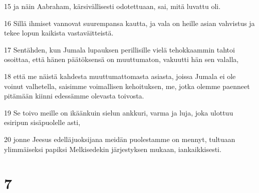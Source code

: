 \par 15 ja näin Aabraham, kärsivällisesti odotettuaan, sai, mitä luvattu oli.
\par 16 Sillä ihmiset vannovat suurempansa kautta, ja vala on heille asian vahvistus ja tekee lopun kaikista vastaväitteistä.
\par 17 Sentähden, kun Jumala lupauksen perillisille vielä tehokkaammin tahtoi osoittaa, että hänen päätöksensä on muuttumaton, vakuutti hän sen valalla,
\par 18 että me näistä kahdesta muuttumattomasta asiasta, joissa Jumala ei ole voinut valhetella, saisimme voimallisen kehoituksen, me, jotka olemme paenneet pitämään kiinni edessämme olevasta toivosta.
\par 19 Se toivo meille on ikäänkuin sielun ankkuri, varma ja luja, joka ulottuu esiripun sisäpuolelle asti,
\par 20 jonne Jeesus edelläjuoksijana meidän puolestamme on mennyt, tultuaan ylimmäiseksi papiksi Melkisedekin järjestyksen mukaan, iankaikkisesti.

\chapter{7}


